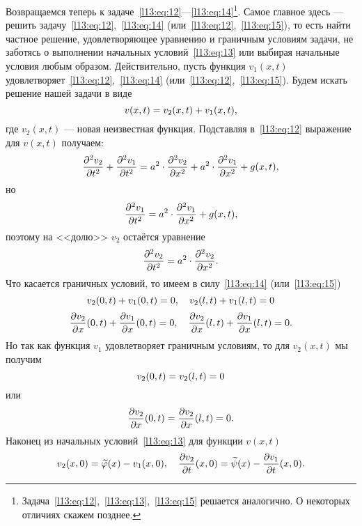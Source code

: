 \documentclass[12pt,a4paper,openany,fleqn]{book}
\newcommand{\pder}[2]{\ensuremath{\frac{\partial#1}{\partial#2}}}
\newcommand{\pdder}[2]{\ensuremath{\frac{\partial^2#1}{\partial#2^2}}}
\theoremstyle{definition}
\begin{document}
	Возвращаемся теперь к задаче~\eqref{l13:eq:12}---\eqref{l13:eq:14}\footnote{Задача~\eqref{l13:eq:12},~\eqref{l13:eq:13},~\eqref{l13:eq:15} решается аналогично. О некоторых отличиях скажем позднее.}. Самое главное здесь --- решить задачу~\eqref{l13:eq:12},~\eqref{l13:eq:14} (или~\eqref{l13:eq:12},~\eqref{l13:eq:15}), то есть найти частное решение, удовлетворяющее уравнению и граничным условиям задачи, не заботясь о выполнении начальных условий~\eqref{l13:eq:13} или выбирая начальные условия любым образом. Действительно, пусть функция $v_1(x,t)$ удовлетворяет~\eqref{l13:eq:12},~\eqref{l13:eq:14} (или~\eqref{l13:eq:12},~\eqref{l13:eq:15}). Будем искать решение нашей задачи в виде
	\begin{equation*}
		\hfill v(x,t)=v_{2}(x,t)+v_1(x,t),\hfill
	\end{equation*}
	где $v_2(x,t)$ --- новая неизвестная функция. Подставляя в~\eqref{l13:eq:12} выражение для $v(x,t)$ получаем:
	\begin{equation*}
		\hfill\pdder{v_2}{t}+\pdder{v_1}{t}=a^2\cdot\pdder{v_2}{x}+a^2\cdot\pdder{v_1}{x}+g(x,t),\hfill
	\end{equation*}
	но
	\begin{equation*}
		\hfill\pdder{v_1}{t}=a^2\cdot\pdder{v_1}{x}+g(x,t),\hfill
	\end{equation*}
	поэтому на <<долю>> $v_2$ остаётся уравнение
	\begin{equation}\label{l13:eq:16}
		\hfill\pdder{v_2}{t}=a^2\cdot\pdder{v_2}{x}.\hfill
	\end{equation}
	Что касается граничных условий, то имеем в силу~\eqref{l13:eq:14} (или~\eqref{l13:eq:15})
	\begin{equation*}
		\hfill v_2(0,t)+v_1(0,t)=0,\quad v_2(l,t)+v_1(l,t)=0\hfill
	\end{equation*} 
	\begin{equation*}
		\hfill \pder{v_2}{x}(0,t)+\pder{v_1}{x}(0,t)=0,\quad \pder{v_2}{x}(l,t)+\pder{v_1}{x}(l,t)=0.\hfill
	\end{equation*} 
	Но так как функция $v_1$ удовлетворяет граничным условиям, то для $v_2(x,t)$ мы получим 
	\begin{equation}\label{l13:eq:17}
		\hfill v_2(0,t)=v_2(l,t)=0\hfill
	\end{equation}
	или
	\begin{equation}\label{l13:eq:18}
		\hfill \pder{v_2}{x}(0,t)=\pder{v_2}{x}(l,t)=0.\hfill
	\end{equation}
	Наконец из начальных условий~\eqref{l13:eq:13} для функции $v(x,t)$ 
	\begin{equation*}
		\hfill v_2(x,0)=\widetilde{\phi}(x)-v_1(x,0),\quad \pder{v_2}{t}(x,0)=\widetilde{\psi}(x)-\pder{v_1}{t}(x,0).\hfill
	\end{equation*}
\end{document}
